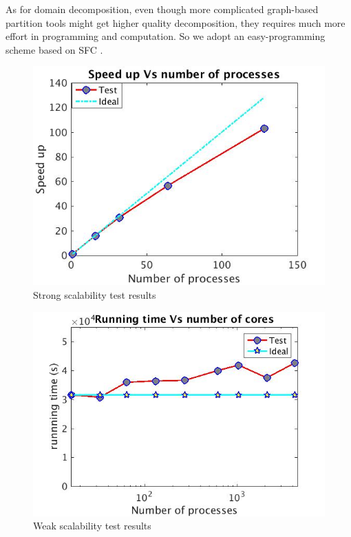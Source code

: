 \documentclass[10pt,a4paper]{article}
\begin{document}
As for domain decomposition, even though more complicated graph-based partition tools\cite{biswas1999experiments} might get higher quality decomposition, they requires much more effort in programming and computation. So we adopt an easy-programming scheme based on SFC \cite{patra1999efficient}.\\
\begin{figure}[!t]
\centering
\includegraphics[scale=0.35]{strong}
\caption{Strong scalability test results}
\label{fig:strong_scale}
\end{figure}

\begin{figure}[!t]
\centering
\includegraphics[scale=0.35]{weak_scale}
\caption{Weak scalability test results}
\label{fig:weak_scale}
\end{figure}
\end{document}
